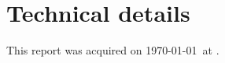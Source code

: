 \documentclass[10pt]{article}
\begin{document}
\tableofcontents
\newpage

\section{Technical details}
This report was acquired on \today\ at \currenttime.
\end{document}
